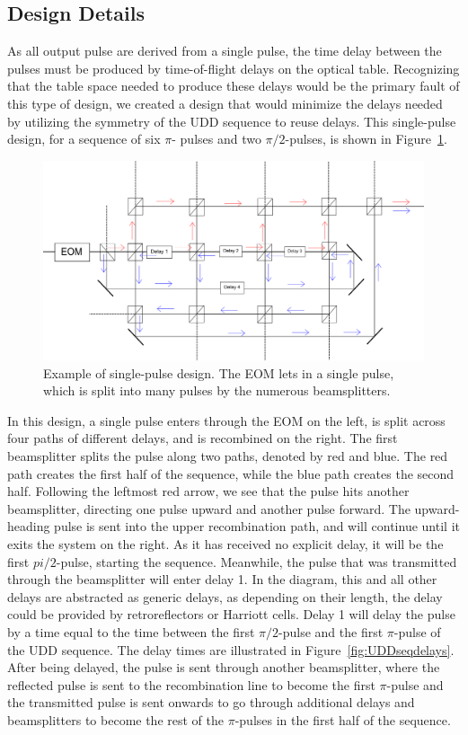 \documentclass[pdftex,12pt,a4paper]{article}
\begin{document}
\subsection{Design Details}
As all output pulse are derived from a single pulse, the time delay between the pulses must be produced by time-of-flight delays on the optical table. Recognizing that the table space needed to produce these delays would be the primary fault of this type of design, we created a design that would minimize the delays needed by utilizing the symmetry of the UDD sequence to reuse delays. This single-pulse design, for a sequence of six $\pi$- pulses and two $\pi/2$-pulses, is shown in Figure~\ref{fig:singlepulse}. 

\begin{figure}[t]
\centering
\includegraphics[width=\textwidth]{singlepulse.png}
\caption{Example of single-pulse design. The EOM lets in a single pulse, which is split into many pulses by the numerous beamsplitters.}
\label{fig:singlepulse}
\end{figure}

In this design, a single pulse enters through the EOM on the left, is split across four paths of different delays, and is recombined on the right. The first beamsplitter splits the pulse along two paths, denoted by red and blue. The red path creates the first half of the sequence, while the blue path creates the second half. Following the leftmost red arrow, we see that the pulse hits another beamsplitter, directing one pulse upward and another pulse forward. The upward-heading pulse is sent into the upper recombination path, and will continue until it exits the system on the right. As it has received no explicit delay, it will be the first $pi/2$-pulse, starting the sequence. Meanwhile, the pulse that was transmitted through the beamsplitter will enter delay 1. In the diagram, this and all other delays are abstracted as generic delays, as depending on their length, the delay could be provided by retroreflectors or Harriott cells. Delay 1 will delay the pulse by a time equal to the time between the first $\pi/2$-pulse and the first $\pi$-pulse of the UDD sequence. The delay times are illustrated in Figure~\ref{fig:UDDseqdelays}. After being delayed, the pulse is sent through another beamsplitter, where the reflected pulse is sent to the recombination line to become the first $\pi$-pulse and the transmitted pulse is sent onwards to go through additional delays and beamsplitters to become the rest of the $\pi$-pulses in the first half of the sequence.
\end{document}

